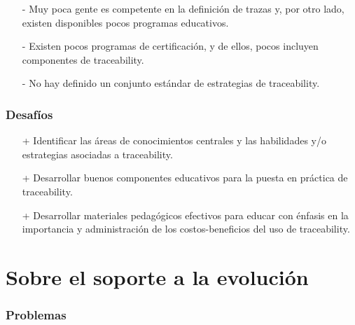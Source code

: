 \documentclass[a4paper,12pt,oneside]{book}
\begin{document}
\begin{itemize}
\item[-]     Muy poca gente es competente en la definición de trazas y, por otro lado, existen disponibles pocos programas educativos.

\item[-]    Existen pocos programas de certificación, y de ellos, pocos incluyen componentes de traceability.

\item[-]   No hay definido un conjunto estándar de estrategias de traceability.

\end{itemize}

\subsubsection{Desafíos}

\begin{itemize}
\item[+]     Identificar las áreas de conocimientos centrales y las habilidades y/o estrategias asociadas a traceability.

\item[+]   Desarrollar buenos componentes educativos para la puesta en práctica de traceability.

\item[+]   Desarrollar materiales pedagógicos efectivos para educar con énfasis en la importancia y administración de los costos-beneficios del uso de traceability.

\end{itemize}

\section{Sobre el soporte a la evolución}

\subsubsection{Problemas}
\end{document}
